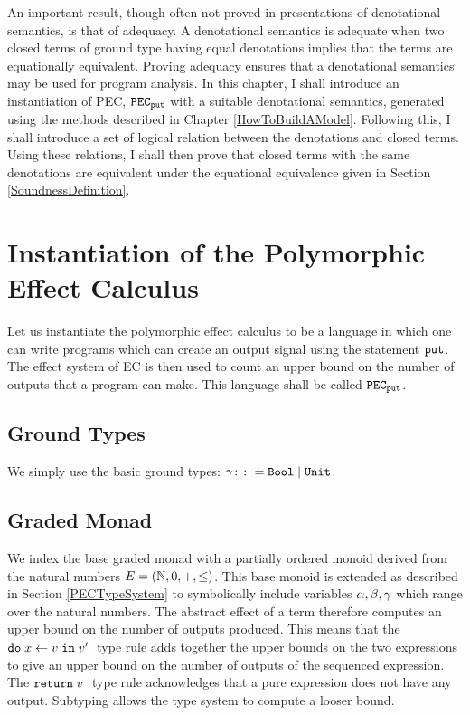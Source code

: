 
    An important result, though often not proved in presentations of denotational semantics, is that of adequacy. A denotational semantics is adequate when two closed terms of ground type having equal denotations implies that the terms are equationally equivalent. Proving adequacy ensures that a denotational semantics may be used for program analysis. In this chapter, I shall introduce an instantiation of PEC,  $\texttt{PEC}_{\texttt{put}}$ with a suitable denotational semantics, generated using the methods described in Chapter \ref{HowToBuildAModel}. Following this, I shall introduce a set of logical relation between the denotations and closed terms. Using these relations, I shall then prove that closed terms with the same denotations are equivalent under the equational equivalence given in Section \ref{SoundnessDefinition}.

    \section{Instantiation of the Polymorphic Effect Calculus}
    Let us instantiate the polymorphic effect calculus to be a language in which one can write programs which can create an output signal using the statement $\texttt{put}$. The effect system of EC is then used to count an upper bound on the number of outputs that a program can make. This language shall be called $\texttt{PEC}_{\texttt{put}}$.

    \subsection{Ground Types}
    We simply use the basic ground types: $\gamma \colon\colon= \texttt{Bool} \mid \texttt{Unit}$.

    \subsection{Graded Monad}
    We index the base graded monad with a partially ordered monoid derived from the natural numbers $E = (\mathbb{N}, 0, +, \leq)$. This base monoid is extended as described in Section \ref{PECTypeSystem} to symbolically include variables $\alpha, \beta, \gamma$ which range over the natural numbers. The abstract effect of a term therefore computes an upper bound on the number of outputs produced.  This means that the $\texttt{do}\; x \leftarrow v \;\texttt{in}\; v'\;$ type rule adds together the upper bounds on the two expressions to give an upper bound on the number of outputs of the sequenced expression. The $\texttt{return} \; v\;$ type rule acknowledges that a pure expression does not have any output. Subtyping  allows the type system to compute a looser bound.
    
